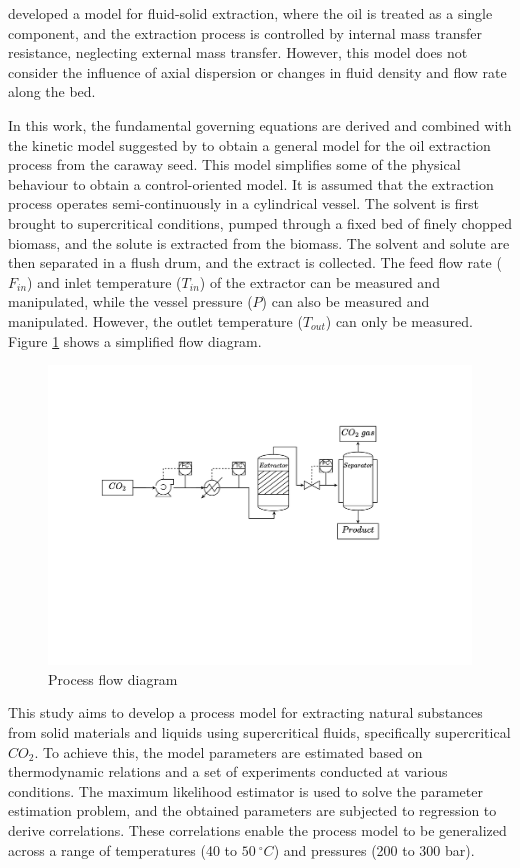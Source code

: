 \documentclass[../Article_Model_Parameters.tex]{subfiles}
\begin{document}
	\citet{Reverchon1996} developed a model for fluid-solid extraction, where the oil is treated as a single component, and the extraction process is controlled by internal mass transfer resistance, neglecting external mass transfer. However, this model does not consider the influence of axial dispersion or changes in fluid density and flow rate along the bed.
	
	In this work, the fundamental governing equations are derived and combined with the kinetic model suggested by \citet{Reverchon1996} to obtain a general model for the oil extraction process from the caraway seed. This model simplifies some of the physical behaviour to obtain a control-oriented model. It is assumed that the extraction process operates semi-continuously in a cylindrical vessel. The solvent is first brought to supercritical conditions, pumped through a fixed bed of finely chopped biomass, and the solute is extracted from the biomass. The solvent and solute are then separated in a flush drum, and the extract is collected. The feed flow rate ($F_{in}$) and inlet temperature ($T_{in}$) of the extractor can be measured and manipulated, while the vessel pressure ($P$) can also be measured and manipulated. However, the outlet temperature ($T_{out}$) can only be measured. Figure \ref{fig: SFE_drawing} shows a simplified flow diagram.
	
	\begin{figure}[h!]
		\centering
		\includegraphics[trim = 5cm 12cm 8cm 6cm, clip,width=\columnwidth]{Figures/PFD.pdf}
		\caption{Process flow diagram}
		\label{fig: SFE_drawing}
	\end{figure}

	This study aims to develop a process model for extracting natural substances from solid materials and liquids using supercritical fluids, specifically supercritical $CO_2$. To achieve this, the model parameters are estimated based on thermodynamic relations and a set of experiments conducted at various conditions. The maximum likelihood estimator is used to solve the parameter estimation problem, and the obtained parameters are subjected to regression to derive correlations. These correlations enable the process model to be generalized across a range of temperatures (40 to $50~^\circ C$) and pressures (200 to 300 bar).
	
\end{document}
